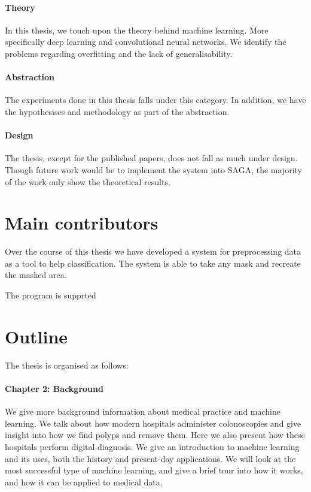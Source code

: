 \paragraph{Theory}
In this thesis, we touch upon the theory behind machine learning. More specifically deep learning and convolutional neural networks. We identify the problems regarding overfitting and the lack of generalisability.

\paragraph{Abstraction}
The experiments done in this thesis falls under this category. In addition, we have the hypothesises and methodology as part of the abstraction.

\paragraph{Design}
The thesis, except for the published papers, does not fall as much under design. Though future work would be to implement the system into SAGA, the majority of the work only show the theoretical results. 





\section{Main contributors}
Over the course of this thesis we have developed a system for preprocessing data as a tool to help classification. 
The system is able to take any mask and recreate the masked area.



The program is supprted

\section{Outline}
The thesis is organised as follows:

\paragraph{Chapter 2: Background}
We give more background information about medical practice and machine learning.
We talk about how modern hospitals administer colonoscopies and give insight into how we find polyps and remove them. Here we also present how these hospitals perform digital diagnosis.  
We give an introduction to machine learning and its uses, both the history and present-day applications. We will look at the most successful type of machine learning, and give a brief tour into how it works, and how it can be applied to medical data.

